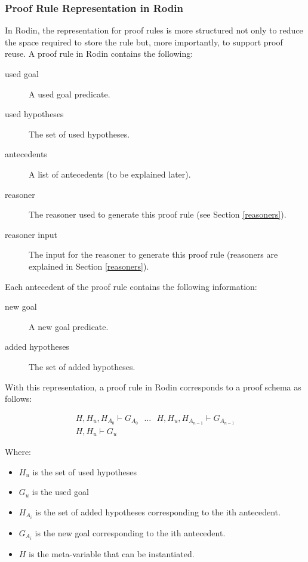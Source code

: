 
\subsubsection{Proof Rule Representation in Rodin}

In Rodin, the representation for proof rules is more structured not only to reduce the space required to store the rule but, more importantly, to support proof reuse.
A proof rule in Rodin contains the following:

\begin{description}
	\item[used goal] A used goal predicate. 
	\item[used hypotheses] The set of used hypotheses. 
	\item[antecedents] A list of antecedents (to be explained later). 
	\item[reasoner] The reasoner used to generate this proof rule (see Section \ref{reasoners}). 
	\item[reasoner input] The input for the reasoner to generate this proof rule (reasoners are explained in Section \ref{reasoners}). 
\end{description}

Each antecedent of the proof rule contains the following information:

\begin{description}
	\item[new goal] A new goal predicate. 
	\item[added hypotheses] The set of added hypotheses. 
\end{description}

With this representation, a proof rule in Rodin corresponds to a proof schema as follows: 

$$\begin{array}{c} H, H_u, H_{A_0} \vdash G_{A_0} ~~~\ldots~~~ H, H_u, H_{A_{n-1}} \vdash G_{A_{n-1}} \\ \hline H, H_u \vdash G_u \end{array} $$

Where:
\begin{itemize}
	\item     $H_u$ is the set of used hypotheses 
	\item     $G_u$ is the used goal 
	\item     $H_{A_i}$ is the set of added hypotheses corresponding to the ith antecedent. 
	\item     $G_{A_i}$ is the new goal corresponding to the ith antecedent. 
	\item     $H$ is the meta-variable that can be instantiated. 
\end{itemize}

